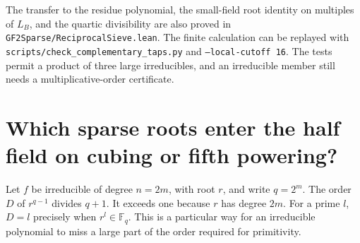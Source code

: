 \documentclass[11pt]{article}
\begin{document}
The transfer to the residue polynomial, the small-field root identity
on multiples of \(L_B\), and the quartic divisibility are also proved in
\nolinkurl{GF2Sparse/ReciprocalSieve.lean}.
The finite calculation can be replayed with
\nolinkurl{scripts/check_complementary_taps.py} and
\texttt{--local-cutoff 16}. The tests permit a product of three
large irreducibles, and an irreducible member still needs a
multiplicative-order certificate.


\section{Which sparse roots enter the half field on cubing or fifth powering?}
\label{sec:half-field-powers}

Let \(f\) be irreducible of degree \(n=2m\), with root \(r\), and
write \(q=2^m\). The order \(D\) of \(r^{q-1}\) divides \(q+1\).
It exceeds one because \(r\) has degree \(2m\). For a prime \(l\),
\(D=l\) precisely when \(r^l\in\mathbb F_q\). This is a particular
way for an irreducible polynomial to miss a large part of the order
required for primitivity.
\end{document}
